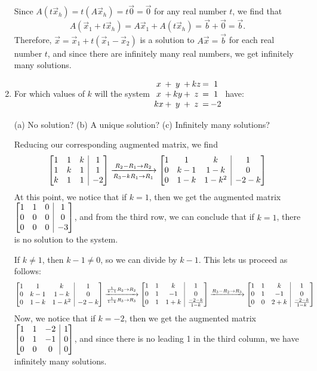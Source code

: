 \documentclass[12pt]{article}
\makeatletter
\newenvironment{amatrix}[1]{%
  \left[\begin{array}{@{}*{#1}{c}|c@{}}
}{%
  \end{array}\right]
}
\newcommand{\bam}{\begin{amatrix}}
\newcommand{\eam}{\end{amatrix}}
\makeatother
\begin{document}
\begin{enumerate}
Since $A(t\vec{x}_h) = t(A\vec{x}_h)=t\vec{0}=\vec{0}$ for any real number $t$, we find that
\[
A(\vec{x}_1+t\vec{x}_h) = A\vec{x}_1+A(t\vec{x}_h) = \vec{b}+\vec{0}=\vec{b}.
\]
Therefore, $\vec{x}=\vec{x}_1+t(\vec{x}_1-\vec{x}_2)$ is a solution to $A\vec{x}=\vec{b}$ for each real number $t$, and since there are infinitely many real numbers, we get infinitely many solutions.

\item For which values of $k$ will the system \hspace{12pt}
$\arraycolsep1pt
\begin{array}{ccccccc}
x&+&y&+&kz&=&1\\
x&+&ky&+&z&=&1\\
kx&+&y&+&z&=&-2
\end{array}$
\hspace{12pt} have: 

(a) No solution? \hspace{12pt} (b) A unique solution? \hspace{12pt} (c) Infinitely many solutions?

Reducing our corresponding augmented matrix, we find
\[
\bam{3}
1&1&k&1\\
1&k&1&1\\
k&1&1&-2\eam\xrightarrow[R_3-kR_1\to R_1]{R_2-R_1\to R_2}
\bam{3}
1&1&k&1\\
0&k-1&1-k&0\\
0&1-k&1-k^2&-2-k\eam
\]
At this point, we notice that if $k=1$, then we get the augmented matrix $\bam{3}1&1&0&1\\0&0&0&0\\0&0&0&-3\eam$, and from the third row, we can conclude that if $k=1$, there is no solution to the system.

If $k\neq 1$, then $k-1\neq 0$, so we can divide by $k-1$. This lets us proceed as follows:
\[
\bam{3}
1&1&k&1\\
0&k-1&1-k&0\\
0&1-k&1-k^2&-2-k\eam\xrightarrow[\frac{1}{1-k}R_3\to R_3]{\frac{1}{k-1}R_2\to R_2}
\bam{3}
1&1&k&1\\
0&1&-1&0\\
0&1&1+k&\frac{-2-k}{1-k}\eam\xrightarrow{R_3-R_2\to R_3}
\bam{3}
1&1&k&1\\
0&1&-1&0\\
0&0&2+k&\frac{-2-k}{1-k}\eam
\]
Now, we notice that if $k=-2$, then we get the augmented matrix $\bam{3}1&1&-2&1\\0&1&-1&0\\0&0&0&0\eam$, and since there is no leading 1 in the third column, we have infinitely many solutions.


\end{enumerate}
\end{document}
